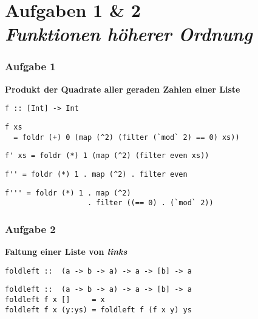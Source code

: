 \documentclass{beamer}
\begin{document}

\section{Aufgaben 1 \& 2 \\ \textit{\normalsize Funktionen höherer Ordnung}}

\begin{frame}[t, fragile] \frametitle{Aufgabe 1}
	\footnotesize
	\textbf{Produkt der Quadrate aller geraden Zahlen einer Liste} \\[6pt]
	\begin{lstlisting}[style=bg]
f :: [Int] -> Int
	\end{lstlisting}
	
	\pause \bigskip 
	
	\begin{lstlisting}[style=bg]
f xs 
  = foldr (+) 0 (map (^2) (filter (`mod` 2) == 0) xs))
	\end{lstlisting}
	\pause
	\begin{lstlisting}[style=bg]
f' xs = foldr (*) 1 (map (^2) (filter even xs))
	\end{lstlisting}
	\pause
	\begin{lstlisting}[style=bg]
f'' = foldr (*) 1 . map (^2) . filter even
	\end{lstlisting}
	\begin{lstlisting}[style=bg]
f''' = foldr (*) 1 . map (^2) 
                   . filter ((== 0) . (`mod` 2))
	\end{lstlisting}
\end{frame}




\begin{frame}[t, fragile] \frametitle{Aufgabe 2}
	\textbf{Faltung einer Liste von \textit{links}} \\[6pt]
	\begin{lstlisting}[style=bg]
foldleft ::  (a -> b -> a) -> a -> [b] -> a
	\end{lstlisting}
	
	\pause \bigskip
	
	\begin{lstlisting}[style=bg]
foldleft ::  (a -> b -> a) -> a -> [b] -> a
foldleft f x []     = x
foldleft f x (y:ys) = foldleft f (f x y) ys
	\end{lstlisting}
\end{frame}
\end{document}

